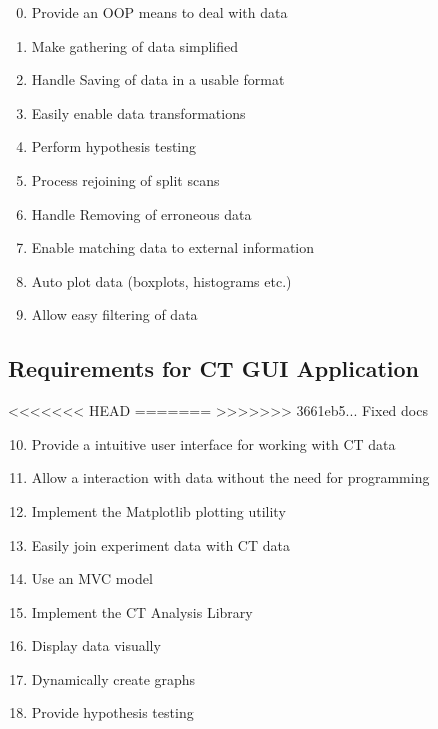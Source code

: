 \documentclass[11pt]{report}
\begin{document}
\begin{multicols}{2}

  \begin{enumerate}
  \setcounter{enumi}{-1}
  \item Provide an OOP means to deal with data
  \item Make gathering of data simplified
  \item Handle Saving of data in a usable format
  \item Easily enable data transformations
  \item Perform hypothesis testing
  \end{enumerate}

  \columnbreak

  \begin{enumerate}
  \setcounter{enumi}{4}
  \item Process rejoining of split scans
  \item Handle Removing of erroneous data
  \item Enable matching data to external information
  \item Auto plot data (boxplots, histograms etc.)
  \item Allow easy filtering of data
  \end{enumerate}

  \columnbreak

\end{multicols}

\subsection{Requirements for CT GUI Application}
<<<<<<< HEAD
\label{sec:org0aed643}
=======
\label{sec:orgb91a735}
>>>>>>> 3661eb5... Fixed docs


\begin{multicols}{2}

  \begin{enumerate}
  \setcounter{enumi}{9}
  \item Provide a intuitive user interface for working with CT data
  \item Allow a interaction with data without the need for programming
  \item Implement the Matplotlib plotting utility
  \item Easily join experiment data with CT data
  \item Use an MVC model
  \end{enumerate}

  \columnbreak

  \begin{enumerate}
  \setcounter{enumi}{14}
  \item Implement the CT Analysis Library
  \item Display data visually
  \item Dynamically create graphs
  \item Provide hypothesis testing
  \end{enumerate}

  \columnbreak

\end{multicols}
\end{document}

